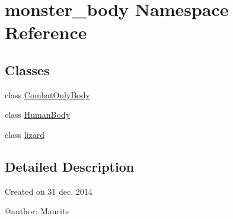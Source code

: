 \hypertarget{namespacemonster__body}{}\section{monster\+\_\+body Namespace Reference}
\label{namespacemonster__body}
\subsection*{Classes}
\begin{DoxyCompactItemize}
\item 
class \hyperlink{classmonster__body_1_1_combat_only_body}{Combat\+Only\+Body}
\item 
class \hyperlink{classmonster__body_1_1_human_body}{Human\+Body}
\item 
class \hyperlink{classmonster__body_1_1lizard}{lizard}
\end{DoxyCompactItemize}


\subsection{Detailed Description}
\begin{DoxyVerb}Created on 31 dec. 2014

@author: Maurits
\end{DoxyVerb}
 
